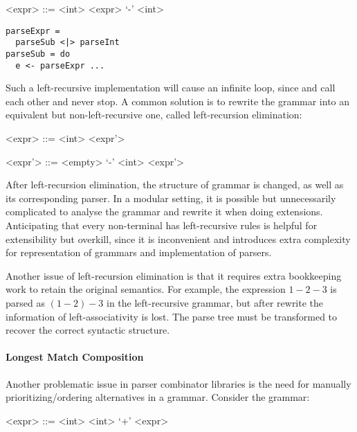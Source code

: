 \begin{minipage}{12em}
\setlength{\grammarindent}{4em}
\begin{grammar}
<expr> ::= <int> \alt <expr> `-' <int>
\end{grammar}
\end{minipage}
\begin{minipage}{15em}
\begin{lstlisting}[language=PlainCode]
parseExpr =
  parseSub <|> parseInt
parseSub = do
  e <- parseExpr ...
\end{lstlisting}
\end{minipage}
Such a left-recursive implementation will cause an infinite loop, since  and  call each other and never stop.
A common solution is to rewrite the grammar into an equivalent but non-left-recursive one, called left-recursion elimination:

\vspace{0.4\baselineskip}
\begin{minipage}{15em}
\setlength{\grammarindent}{5em}
\begin{grammar}
<expr> ::= <int> <expr'>

<expr'> ::= <empty> \alt `-' <int> <expr'>
\end{grammar}
\end{minipage}
\vspace{0.4\baselineskip}

\noindent After left-recursion elimination, the structure of grammar is changed,
as well as its corresponding parser. In a modular setting, it is
possible but unnecessarily complicated to analyse the grammar and
rewrite it when doing extensions. Anticipating that every non-terminal
has left-recursive rules is helpful for extensibility but overkill,
since it is inconvenient and introduces extra complexity for
representation of grammars and implementation of parsers.

Another issue of left-recursion elimination is that it requires extra
bookkeeping work to retain the original semantics. For example, the
expression $1-2-3$ is parsed as $(1-2)-3$ in the left-recursive
grammar, but after rewrite the information of left-associativity is lost. The parse tree
must be transformed to recover the correct syntactic structure.

\paragraph{Longest Match Composition} Another problematic issue
in parser combinator libraries is the need for manually prioritizing/ordering
alternatives in a grammar.
Consider the grammar:
\vspace{-2pt}
\setlength{\grammarindent}{5em}
\begin{grammar}
<expr> ::= <int> \alt <int> `+' <expr>
\end{grammar}
\vspace{-2pt}

